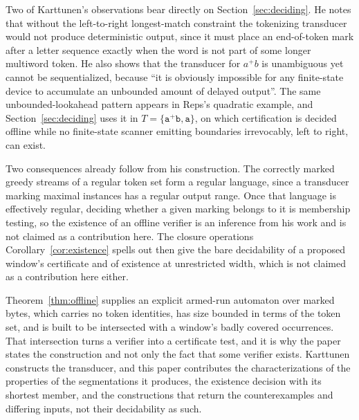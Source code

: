 \documentclass[11pt,a4paper]{article}
\theoremstyle{definition}
\theoremstyle{plain}
\newcommand{\code}[1]{\texttt{#1}}
\begin{document}
Two of Karttunen's observations bear directly on Section~\ref{sec:deciding}. He notes that without the left-to-right
longest-match constraint the tokenizing transducer would not produce deterministic output, since it must place an
end-of-token mark after a letter sequence exactly when the word is not part of some longer multiword token. He also
shows that the transducer for $a^{+}b$ is unambiguous yet cannot be sequentialized, because ``it is obviously impossible
for any finite-state device to accumulate an unbounded amount of delayed output''. The same unbounded-lookahead pattern
appears in Reps's quadratic example, and Section~\ref{sec:deciding} uses it in $T = \{\code{a}^{+}\code{b}, \code{a}\}$,
on which certification is decided offline while no finite-state scanner emitting boundaries irrevocably, left to right,
can exist.

Two consequences already follow from his construction. The correctly marked greedy streams of a regular token set form a
regular language, since a transducer marking maximal instances has a regular output range. Once that language is
effectively regular, deciding whether a given marking belongs to it is membership testing, so the existence of an
offline verifier is an inference from his work and is not claimed as a contribution here. The closure operations
Corollary~\ref{cor:existence} spells out then give the bare decidability of a proposed window's certificate and of
existence at unrestricted width, which is not claimed as a contribution here either.

Theorem~\ref{thm:offline} supplies an explicit armed-run automaton over marked bytes, which carries no token identities,
has size bounded in terms of the token set, and is built to be intersected with a window's badly covered occurrences.
That intersection turns a verifier into a certificate test, and it is why the paper states the construction and not only
the fact that some verifier exists. Karttunen constructs the transducer, and this paper contributes the
characterizations of the properties of the segmentations it produces, the existence decision with its shortest member,
and the constructions that return the counterexamples and differing inputs, not their decidability as such.
\end{document}
